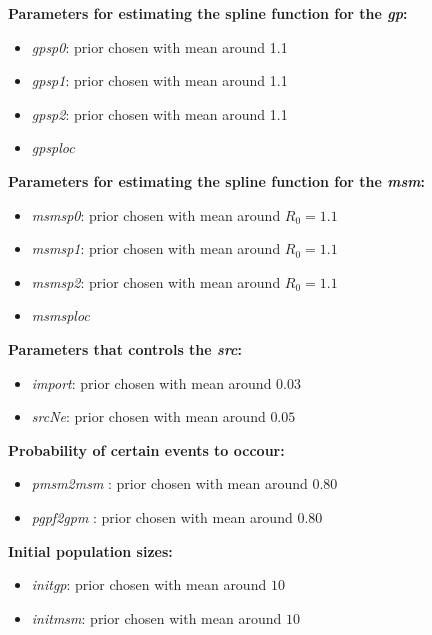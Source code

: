 \documentclass[12pt,]{article}
\providecommand{\tightlist}{%
  \setlength{\itemsep}{0pt}\setlength{\parskip}{0pt}}
\begin{document}
\textbf{Parameters for estimating the spline function for the
\emph{gp}:}

\begin{itemize}
\tightlist
\item
  \emph{gpsp0}: prior chosen with mean around 1.1
\item
  \emph{gpsp1}: prior chosen with mean around 1.1
\item
  \emph{gpsp2}: prior chosen with mean around 1.1
\item
  \emph{gpsploc}
\end{itemize}

\textbf{Parameters for estimating the spline function for the
\emph{msm}:}

\begin{itemize}
\tightlist
\item
  \emph{msmsp0}: prior chosen with mean around \(R_0 = 1.1\)
\item
  \emph{msmsp1}: prior chosen with mean around \(R_0 = 1.1\)
\item
  \emph{msmsp2}: prior chosen with mean around \(R_0 = 1.1\)
\item
  \emph{msmsploc}
\end{itemize}

\textbf{Parameters that controls the \emph{src}:}

\begin{itemize}
\tightlist
\item
  \emph{import}: prior chosen with mean around \(0.03\)
\item
  \emph{srcNe}: prior chosen with mean around \(0.05\)
\end{itemize}

\textbf{Probability of certain events to occour:}

\begin{itemize}
\tightlist
\item
  \emph{pmsm2msm} : prior chosen with mean around \(0.80\)
\item
  \emph{pgpf2gpm} : prior chosen with mean around \(0.80\)
\end{itemize}

\textbf{Initial population sizes:}

\begin{itemize}
\tightlist
\item
  \emph{initgp}: prior chosen with mean around \(10\)
\item
  \emph{initmsm}: prior chosen with mean around \(10\)
\end{itemize}
\end{document}
